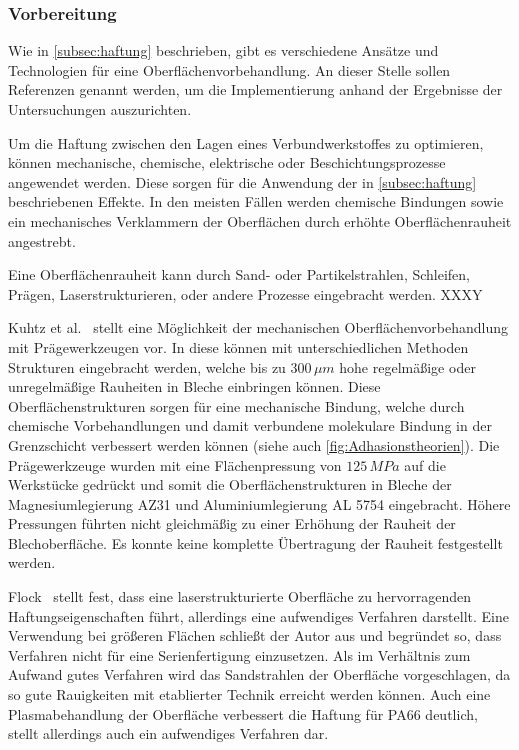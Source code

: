 \subsubsection{Vorbereitung}

Wie in \autoref{subsec:haftung} beschrieben, gibt es verschiedene Ansätze und Technologien für eine Oberflächenvorbehandlung.
An dieser Stelle sollen Referenzen genannt werden, um die Implementierung anhand der Ergebnisse der Untersuchungen auszurichten.

Um die Haftung zwischen den Lagen eines Verbundwerkstoffes zu optimieren, können mechanische, chemische, elektrische oder Beschichtungsprozesse angewendet werden.
Diese sorgen für die Anwendung der in \autoref{subsec:haftung} beschriebenen Effekte.
In den meisten Fällen werden chemische Bindungen sowie ein mechanisches Verklammern der Oberflächen durch erhöhte Oberflächenrauheit angestrebt.

Eine Oberflächenrauheit kann durch Sand- oder Partikelstrahlen, Schleifen, Prägen, Laserstrukturieren, oder andere Prozesse eingebracht werden.
XXXY

Kuhtz et al.~\cite{Kuhtz.2019} stellt eine Möglichkeit der mechanischen Oberflächenvorbehandlung mit Prägewerkzeugen vor.
In diese können mit unterschiedlichen Methoden Strukturen eingebracht werden, welche bis zu $300\, \mu m$ hohe regelmäßige oder unregelmäßige Rauheiten in Bleche einbringen können.
Diese Oberflächenstrukturen sorgen für eine mechanische Bindung, welche durch chemische Vorbehandlungen und damit verbundene molekulare Bindung in der Grenzschicht verbessert werden können (siehe auch \autoref{fig:Adhasionstheorien}).
Die Prägewerkzeuge wurden mit eine Flächenpressung von $125\, MPa$ auf die Werkstücke gedrückt und somit die Oberflächenstrukturen in Bleche der Magnesiumlegierung AZ31 und Aluminiumlegierung AL 5754 eingebracht.
Höhere Pressungen führten nicht gleichmäßig zu einer Erhöhung der Rauheit der Blechoberfläche.
Es konnte keine komplette Übertragung der Rauheit festgestellt werden.

Flock~\cite{Flock.b} stellt fest, dass eine laserstrukturierte Oberfläche zu hervorragenden Haftungseigenschaften führt, allerdings eine aufwendiges Verfahren darstellt.
Eine Verwendung bei größeren Flächen schließt der Autor aus und begründet so, dass Verfahren nicht für eine Serienfertigung einzusetzen.
Als im Verhältnis zum Aufwand gutes Verfahren wird das Sandstrahlen der Oberfläche vorgeschlagen, da so gute Rauigkeiten mit etablierter Technik erreicht werden können.
Auch eine Plasmabehandlung der Oberfläche verbessert die Haftung für PA66 deutlich, stellt allerdings auch ein aufwendiges Verfahren dar.

